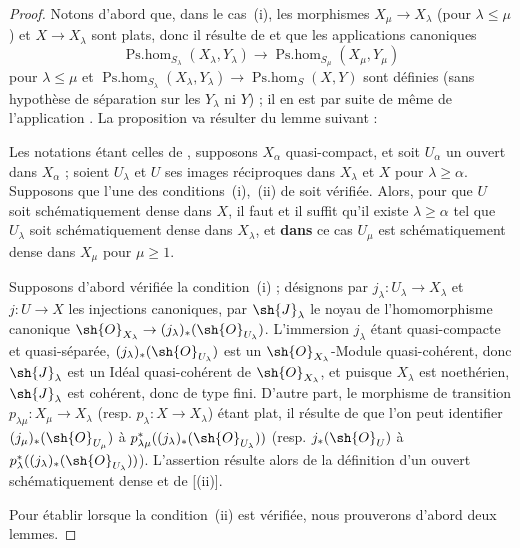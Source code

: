 \begin{proof}
Notons d'abord que, dans le cas~(i), les morphismes $X_\mu\to X_\lambda$ (pour $\lambda\leq\mu$) et $X\to X_\lambda$ sont plats, donc il résulte de  et  que les applications canoniques
\[
  \operatorname{Ps.hom}_{S_\lambda}(X_\lambda,Y_\lambda)\to\operatorname{Ps.hom}_{S_\mu}(X_\mu,Y_\mu)
\]
pour $\lambda\leq\mu$ et $\operatorname{Ps.hom}_{S_\lambda}(X_\lambda,Y_\lambda)\to\operatorname{Ps.hom}_S(X,Y)$ sont définies (sans hypothèse de séparation sur les $Y_\lambda$ ni $Y$) ; il en est par suite de même de l'application .
La proposition va résulter du lemme suivant :

\begin{lemma}[20.3.8.2]
\label{IV.20.3.8.2}
Les notations étant celles de , supposons $X_\alpha$ quasi-compact, et soit $U_\alpha$ un ouvert dans $X_\alpha$ ; soient $U_\lambda$ et $U$ ses images réciproques dans $X_\lambda$ et $X$ pour $\lambda\geq\alpha$.
Supposons que l'une des conditions~\textup{(i)},~\textup{(ii)} de  soit vérifiée.
Alors, pour que $U$ soit schématiquement dense dans $X$, il faut et il suffit qu'il existe $\lambda\geq\alpha$ tel que $U_\lambda$ soit schématiquement dense dans $X_\lambda$, et \textbf{dans} ce cas $U_\mu$ est schématiquement dense dans $X_\mu$ pour $\mu\geq 1$.
\end{lemma}

Supposons d'abord vérifiée la condition~(i) ; désignons par $j_\lambda:U_\lambda\to X_\lambda$ et $j:U\to X$ les injections canoniques, par $\sh{J}_\lambda$ le noyau de l'homomorphisme canonique $\sh{O}_{X_\lambda}\to(j_\lambda)_*(\sh{O}_{U_\lambda})$.
L'immersion $j_\lambda$ étant quasi-compacte et quasi-séparée, $(j_\lambda)_*(\sh{O}_{U_\lambda})$ est un $\sh{O}_{X_\lambda}$-Module quasi-cohérent, donc $\sh{J}_\lambda$ est un Idéal quasi-cohérent de $\sh{O}_{X_\lambda}$, et puisque $X_\lambda$ est noethérien, $\sh{J}_\lambda$ est cohérent, donc de type fini.
D'autre part, le morphisme de transition $p_{\lambda\mu}:X_\mu\to X_\lambda$ (resp. $p_\lambda:X\to X_\lambda$) étant plat, il résulte de  que l'on peut identifier $(j_\mu)_*(\sh{O}_{U_\mu})$ à $p_{\lambda\mu}^*((j_\lambda)_*(\sh{O}_{U_\lambda}))$ (resp. $j_*(\sh{O}_U)$ à $p_\lambda^*((j_\lambda)_*(\sh{O}_{U_\lambda}))$).
L'assertion résulte alors de la définition d'un ouvert schématiquement dense et de [(ii)].

Pour établir  lorsque la condition~(ii) est vérifiée, nous prouverons d'abord deux lemmes.


\end{proof}
